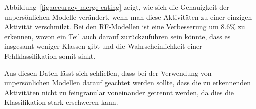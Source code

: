 Abbildung~\ref{fig:accuracy-merge-eating} zeigt, wie sich die Genauigkeit der unpersönlichen Modelle verändert, wenn man diese Aktivitäten zu einer einzigen Aktivität verschmilzt.  Bei den RF-Modellen ist eine Verbesserung um $8.6 \%$ zu erkennen, wovon ein Teil auch darauf zurückzuführen sein könnte, dass es insgesamt weniger Klassen gibt und die Wahrscheinlichkeit einer Fehlklassifikation somit sinkt.

Aus diesen Daten lässt sich schließen, dass bei der Verwendung von unpersönlichen Modellen darauf geachtet werden sollte, dass die zu erkennenden Aktivitäten nicht zu feingranular voneinander getrennt werden, da dies die Klassifikation stark erschweren kann.

